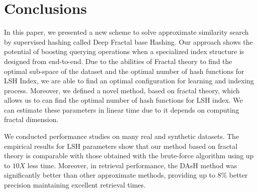 \documentclass[conference]{IEEEtran}
\begin{document}
\section{Conclusions}

In this paper, we presented a new scheme to solve approximate similarity search by supervised hashing called Deep Fractal base Hashing.  Our approach shows the potential of boosting querying operations when a specialized index structure is designed from end-to-end.  Due to the abilities of Fractal theory to find the optimal sub-space of the dataset and the optimal number of hash functions for LSH Index, we are able to find an optimal configuration for learning and indexing process.  Moreover, we defined a novel method, based on fractal theory, which allows us to can find the optimal number of hash functions for  LSH index. We can estimate these parameters in linear time due to it depends on computing fractal dimension. 

We conducted performance studies on many real and synthetic datasets.  The empirical results for LSH parameters show that our method based on fractal theory is comparable with those obtained with the brute-force algorithm using up to $10X$ less time. Moreover, in retrieval performance, the DAsH method was significantly better than other approximate methods, providing up to 8\%  better precision maintaining excellent retrieval times.  %






\end{document}
